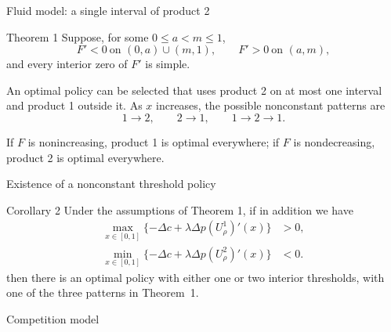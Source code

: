 \documentclass[10pt]{beamer}
\begin{document}
\begin{frame}{Fluid model: a single interval of product 2}

    \begin{block}{Theorem 1}
        Suppose, for some $0\le a<m\le1$,
        \[
        F'<0\ \text{on }(0,a)\cup(m,1),
        \qquad F'>0\ \text{on }(a,m),
        \]
        and every interior zero of $F'$ is simple.

        \medskip
        An optimal policy can be selected that uses product 2 on
        at most one interval and product 1 outside it.
        As $x$ increases, the possible nonconstant patterns are
        \[
        1\to2,\qquad 2\to1,\qquad 1\to2\to1.
        \]
    \end{block}


    \medskip
    If $F$ is nonincreasing, product 1 is optimal everywhere;
    if $F$ is nondecreasing, product 2 is optimal everywhere.
\end{frame}

\begin{frame}{Existence of a nonconstant threshold policy}
    \begin{block}{Corollary 2}
        Under the assumptions of Theorem 1, if in addition we have 
        \begin{align*}
        \max_{x\in[0,1]}\{-\Delta c+\lambda\Delta p(U^1_\rho)'(x)\}&>0,\\
        \min_{x\in[0,1]}\{-\Delta c+\lambda\Delta p(U^2_\rho)'(x)\}&<0.
        \end{align*}
        then there is an optimal policy with either one or two interior thresholds, with one of the three patterns in
        Theorem~1.
    \end{block}
\end{frame}

\begin{frame}[plain,s]
    \vfill
    \centering
    {\LARGE
    Competition model\par}
    \vfill
\end{frame}
\end{document}
